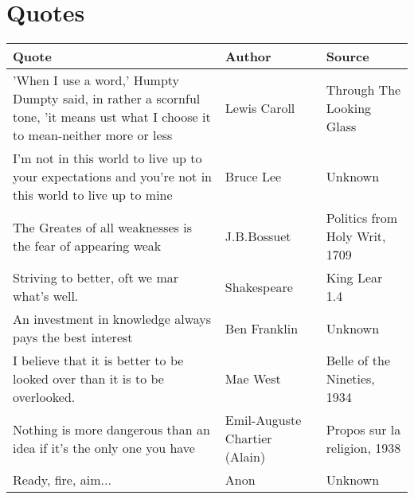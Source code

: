 \documentclass{article}
\begin{document}
\section*{Quotes}
    \begin{tabularx}{0.8\textwidth} { 
  | >{\centering\arraybackslash}X 
  | >{\centering\arraybackslash}X 
  |  >{\centering\arraybackslash}X |}
    \hline
    
    Quote & Author & Source\\
    
    \hline
    
    'When I use a word,' Humpty Dumpty said, in rather a scornful tone, 'it means ust what I choose it to mean-neither more or less 
    & Lewis Caroll 
    & Through The Looking Glass \\
    
    \hline

    I'm not in this world to live up to your expectations and you're not in this world to live up to mine
    & Bruce Lee
    & Unknown\\

    \hline

    The Greates of all weaknesses is the fear of appearing weak 
    & J.B.Bossuet
    & Politics from Holy Writ, 1709\\

    \hline

    Striving to better, oft we mar what's well.
    & Shakespeare
    & King Lear 1.4\\

    \hline

    An investment in knowledge always pays the best interest
    & Ben Franklin
    & Unknown \\

    \hline

    I believe that it is better to be looked over than it is to be overlooked.
    & Mae West
    & Belle of the Nineties, 1934 \\

    \hline

    Nothing is more dangerous than an idea if it's the only one you have 
    & Emil-Auguste Chartier (Alain)
    & Propos sur la religion, 1938 \\

    \hline

    Ready, fire, aim...
    & Anon
    & Unknown \\

    \hline


\end{tabularx}
\end{document}
